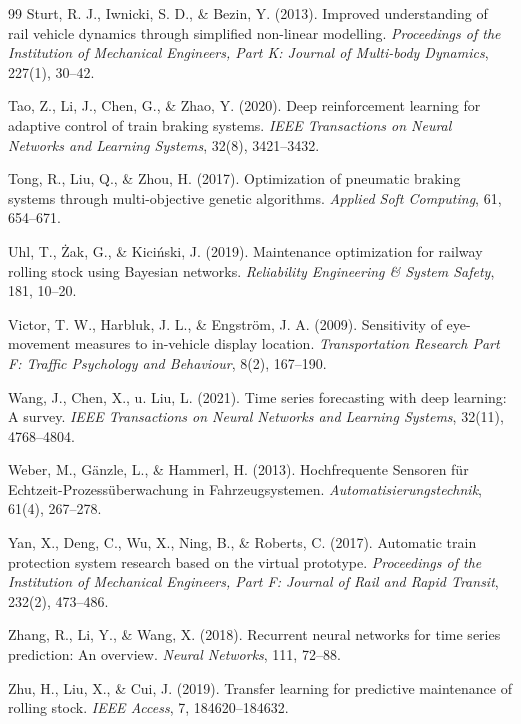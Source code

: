 \documentclass[a4paper,12pt]{article}
\theoremstyle{definition}
\begin{document}
\begin{thebibliography}{99}
 Sturt, R. J., Iwnicki, S. D., \& Bezin, Y. (2013). Improved understanding of rail vehicle dynamics through simplified non-linear modelling. \textit{Proceedings of the Institution of Mechanical Engineers, Part K: Journal of Multi-body Dynamics}, 227(1), 30--42.

 Tao, Z., Li, J., Chen, G., \& Zhao, Y. (2020). Deep reinforcement learning for adaptive control of train braking systems. \textit{IEEE Transactions on Neural Networks and Learning Systems}, 32(8), 3421--3432.

 Tong, R., Liu, Q., \& Zhou, H. (2017). Optimization of pneumatic braking systems through multi-objective genetic algorithms. \textit{Applied Soft Computing}, 61, 654--671.

 Uhl, T., Żak, G., \& Kiciński, J. (2019). Maintenance optimization for railway rolling stock using Bayesian networks. \textit{Reliability Engineering \& System Safety}, 181, 10--20.

 Victor, T. W., Harbluk, J. L., \& Engström, J. A. (2009). Sensitivity of eye-movement measures to in-vehicle display location. \textit{Transportation Research Part F: Traffic Psychology and Behaviour}, 8(2), 167--190.

 Wang, J., Chen, X., u. Liu, L. (2021). Time series forecasting with deep learning: A survey. \textit{IEEE Transactions on Neural Networks and Learning Systems}, 32(11), 4768--4804.

 Weber, M., Gänzle, L., \& Hammerl, H. (2013). Hochfrequente Sensoren für Echtzeit-Prozessüberwachung in Fahrzeugsystemen. \textit{Automatisierungstechnik}, 61(4), 267--278.

 Yan, X., Deng, C., Wu, X., Ning, B., \& Roberts, C. (2017). Automatic train protection system research based on the virtual prototype. \textit{Proceedings of the Institution of Mechanical Engineers, Part F: Journal of Rail and Rapid Transit}, 232(2), 473--486.

 Zhang, R., Li, Y., \& Wang, X. (2018). Recurrent neural networks for time series prediction: An overview. \textit{Neural Networks}, 111, 72--88.

 Zhu, H., Liu, X., \& Cui, J. (2019). Transfer learning for predictive maintenance of rolling stock. \textit{IEEE Access}, 7, 184620--184632.

\end{thebibliography}
\end{document}
